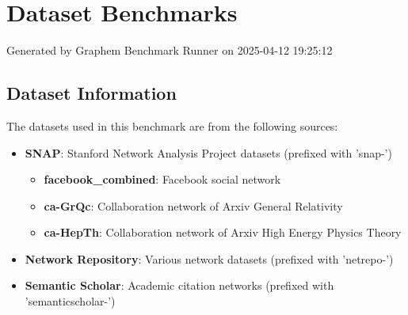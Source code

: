 \documentclass{article}
\begin{document}
\section*{Dataset Benchmarks}
Generated by Graphem Benchmark Runner on 2025-04-12 19:25:12
\subsection*{Dataset Information}
The datasets used in this benchmark are from the following sources:
\begin{itemize}
\item \textbf{SNAP}: Stanford Network Analysis Project datasets (prefixed with 'snap-')
  \begin{itemize}
  \item \textbf{facebook\_combined}: Facebook social network
  \item \textbf{ca-GrQc}: Collaboration network of Arxiv General Relativity
  \item \textbf{ca-HepTh}: Collaboration network of Arxiv High Energy Physics Theory
  \end{itemize}
\item \textbf{Network Repository}: Various network datasets (prefixed with 'netrepo-')
\item \textbf{Semantic Scholar}: Academic citation networks (prefixed with 'semanticscholar-')
\end{itemize}
\end{document}

